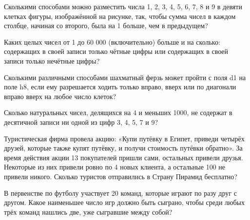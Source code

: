  Сколькими способами можно
разместить числа 1, 2, 3, 4, 5, 6, 7, 8 и 9 в девяти клетках фигуры, изображённой на рисунке, так, чтобы сумма чисел в каждом столбце, начиная
со второго, была на 1 больше, чем в предыдущем?

 Каких целых чисел от 1 до 60 000 (включительно) больше и на сколько: содержащих в своей записи только чётные цифры или содержащих в своей записи только
нечётные цифры?

 Сколькими различными способами шахматный ферзь может пройти с поля d1 на поле h8, если ему разрешается ходить только вправо, вверх или по диагонали
вправо вверх на любое число клеток?

 Сколько натуральных чисел, делящихся на 4 и
меньших 1000, не содержат в десятичной записи ни одной из цифр 3, 4, 5, 7 и 9?

 Туристическая фирма провела акцию: «Купи путёвку в Египет,
приведи четырёх друзей, которые также купят путёвку, и получи стоимость путёвки обратно».
За время действия акции 13 покупателей пришли сами, остальных привели друзья. Некоторые
из них привели ровно по 4 новых клиента, а остальные 100 не привели никого. Сколько туристов
отправились в Страну Пирамид бесплатно?

 В первенстве по футболу участвует 20 команд, которые играют по разу
друг с другом. Какое наименьшее число игр должно быть сыграно, чтобы среди любых трёх
команд нашлись две, уже сыгравшие между собой?